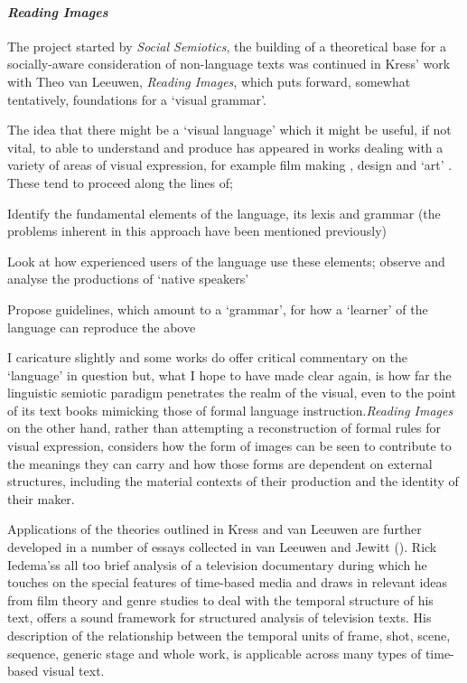 \paragraph{\textit{Reading Images}}

The project started by \textit{Social Semiotics}, the building of a theoretical base for a socially-aware consideration of non-language texts was continued in Kress' work with Theo van Leeuwen, \textit{Reading Images}, which puts forward, somewhat tentatively, foundations for a `visual grammar'.

The idea that there might be a `visual language' which it might be useful, if not vital, to able to understand and produce has appeared in works dealing with a variety of areas of visual expression, for example film making \citep{Thompson:1993,Thompson:1998}, design \citep{Dondis:1974} and `art' \citep{Goodman:1976}. These tend to proceed along the lines of;

\begin{close_enum}
\item Identify the fundamental elements of the language, its lexis and grammar (the problems inherent in this approach have been mentioned previously)
\item Look at how experienced users of the language use these elements; observe and analyse the productions of `native speakers'
\item Propose guidelines, which amount  to a `grammar', for how a `learner' of the language can reproduce the above
\end{close_enum}

I caricature slightly and some works do offer critical commentary on the `language' in question but, what I hope to have made clear again, is how far the linguistic semiotic paradigm penetrates the realm of the visual, even to the point of its text books mimicking those of formal language instruction.\textit{Reading Images} on the other hand, rather than attempting a reconstruction of formal rules for visual expression, considers how the form of images can be seen to contribute to the meanings they can carry and how those forms are dependent on external structures, including the material contexts of their production and the identity of their maker. 

Applications of the theories outlined in Kress and van Leeuwen are further developed in a number of essays collected in van Leeuwen and Jewitt (\citeyear{Van-Leeuwen:2001}). Rick Iedema'ss all too brief analysis of a television documentary during which he touches on the special features of time-based media and draws in relevant ideas from film theory and genre studies to deal with the temporal structure of his text, offers a sound framework for structured analysis of television texts. His description of the relationship between the temporal units of frame, shot, scene, sequence, generic stage and whole work, is applicable across many types of time-based visual text.

